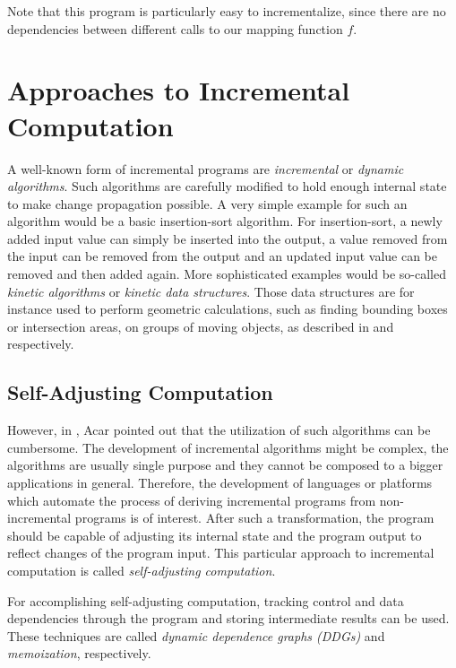 Note that this program is particularly easy to incrementalize, since there are no dependencies between different calls to our mapping function $f$. 
\section{Approaches to Incremental Computation}


A well-known form of incremental programs are \textit{incremental} or \textit{dynamic algorithms}. Such algorithms are carefully modified to hold enough internal state to make change propagation possible. A very simple example for such an algorithm would be a basic insertion-sort algorithm. For insertion-sort, a newly added input value can simply be inserted into the output, a value removed from the input can be removed from the output and an updated input value can be removed and then added again. More sophisticated examples would be so-called \textit{kinetic algorithms} or \textit{kinetic data structures}. Those data structures are for instance used to perform geometric calculations, such as finding bounding boxes or intersection areas, on groups of moving objects, as described in \cite{yu2008practical} and \cite{basch2004kinetic} respectively.

\subsection{Self-Adjusting Computation}

However, in \cite{Acar2005thesis}, Acar pointed out that the utilization of such algorithms can be cumbersome. The development of incremental algorithms might be complex, the algorithms are usually single purpose and they cannot be composed to a bigger applications in general. Therefore, the development of languages or platforms which automate the process of deriving incremental programs from non-incremental programs is of interest. After such a transformation, the program should be capable of adjusting its internal state and the program output to reflect changes of the program input. This particular approach to incremental computation is called \textit{self-adjusting computation}.

For accomplishing self-adjusting computation, tracking control and data dependencies through the program and storing intermediate results can be used. These techniques are called \textit{dynamic dependence graphs (DDGs)} and \textit{memoization}, respectively. 

